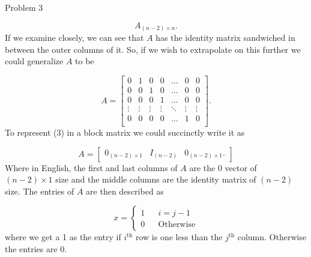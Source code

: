 \begin{problem}{Problem 3}
\begin{Highlight}[Solution]
        \begin{equation}
            A_{(n - 2) \times n}.
        \end{equation}
        If we examine closely, we can see that $A$ has the identity matrix sandwiched in between the outer columns of it. So, if we wish to extrapolate on this further we could generalize $A$ to be

        \begin{equation}
            A = 
            \begin{bmatrix}
                0 & 1 & 0 & 0 & \dots & 0 & 0 \\
                0 & 0 & 1 & 0 & \dots & 0 & 0 \\
                0 & 0 & 0 & 1 & \dots & 0 & 0 \\
                \vdots & \vdots & \vdots & \vdots & \ddots & \vdots & \vdots \\
                0 & 0 & 0 & 0 & \dots & 1 & 0 \\
            \end{bmatrix}.
        \end{equation}
        To represent (3) in a block matrix we could succinctly write it as 

        \begin{equation}
            A =
            \begin{bmatrix}
                0_{(n-2)\times 1} & I_{(n-2)} & 0_{(n - 2) \times 1}.
            \end{bmatrix}
        \end{equation}
        Where in English, the first and last columns of $A$ are the 0 vector of $(n - 2) \times 1$ size and the middle columns are the identity matrix of $(n - 2)$ size. The entries of $A$ are then
        described as 

        \begin{equation}
            x = \left\{
                \begin{aligned}
                    1 & & i = j - 1 \\
                    0 & & \text{Otherwise} 
                \end{aligned}
            \right.
        \end{equation}
        where we get a 1 as the entry if $i^{\text{th}}$ row is one less than the $j^{\text{th}}$ column. Otherwise the entries are 0.
    \end{Highlight}
\end{problem}

